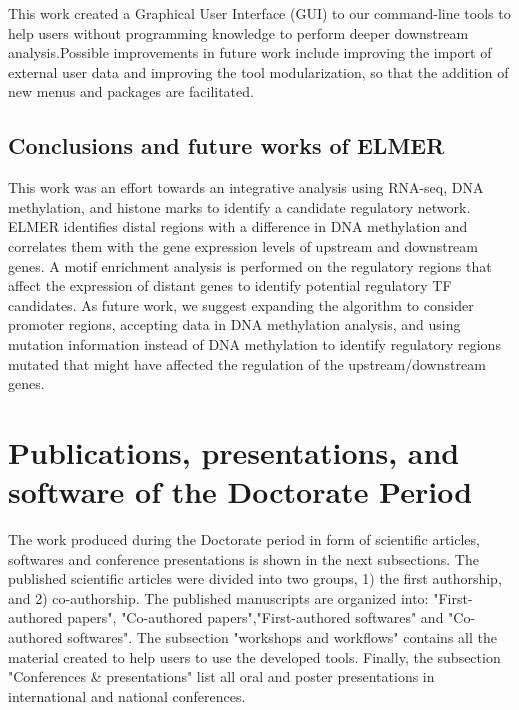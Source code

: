This work created a Graphical User Interface (GUI) to our command-line tools to help users without programming knowledge to perform deeper downstream analysis.Possible improvements in future work include improving the import of external user data and improving the tool modularization, so that the addition of new menus and packages are facilitated.

\subsection{Conclusions and future works of ELMER}

This work was an effort towards an integrative analysis
using RNA-seq, DNA methylation, and histone marks to identify a candidate regulatory network.
ELMER identifies distal regions with a difference in DNA methylation and correlates them
with the gene expression levels of upstream and downstream genes.
A motif enrichment analysis is performed on the regulatory regions that affect the expression of distant genes to identify potential
regulatory TF candidates. As future work, we suggest expanding the algorithm to consider promoter regions,  accepting  data in  DNA methylation analysis, and using mutation information instead of DNA methylation
to identify regulatory regions mutated that might have affected the regulation of the upstream/downstream genes.

\section{Publications, presentations, and software of the Doctorate Period}

The work produced during the Doctorate period in form of scientific articles,
softwares and conference presentations is shown in the next subsections.
The published scientific articles were divided into two groups, 1) the first authorship, and 2) co-authorship. The published manuscripts are organized into: "First-authored papers", "Co-authored papers","First-authored softwares" and "Co-authored softwares".
The subsection "workshops and workflows" contains all the material created to help users to use the developed tools. Finally, the subsection "Conferences \& presentations" list all oral and poster presentations in international and national conferences.


